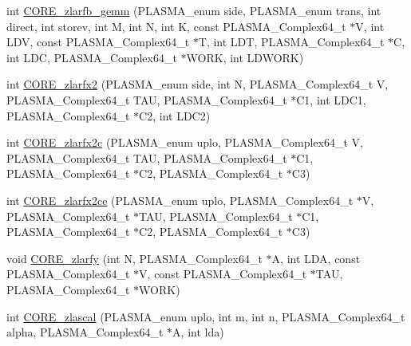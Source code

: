 \begin{DoxyCompactItemize}
\item 
int \hyperlink{group__CORE__PLASMA__Complex64__t_ga0c1fe71b571fb7ba94b9d4177a5d081f_ga0c1fe71b571fb7ba94b9d4177a5d081f}{C\+O\+R\+E\+\_\+zlarfb\+\_\+gemm} (P\+L\+A\+S\+M\+A\+\_\+enum side, P\+L\+A\+S\+M\+A\+\_\+enum trans, int direct, int storev, int M, int N, int K, const P\+L\+A\+S\+M\+A\+\_\+\+Complex64\+\_\+t $\ast$V, int L\+D\+V, const P\+L\+A\+S\+M\+A\+\_\+\+Complex64\+\_\+t $\ast$T, int L\+D\+T, P\+L\+A\+S\+M\+A\+\_\+\+Complex64\+\_\+t $\ast$C, int L\+D\+C, P\+L\+A\+S\+M\+A\+\_\+\+Complex64\+\_\+t $\ast$W\+O\+R\+K, int L\+D\+W\+O\+R\+K)
\item 
int \hyperlink{group__CORE__PLASMA__Complex64__t_ga1221507a1c507991fdb0adf89ac5872b_ga1221507a1c507991fdb0adf89ac5872b}{C\+O\+R\+E\+\_\+zlarfx2} (P\+L\+A\+S\+M\+A\+\_\+enum side, int N, P\+L\+A\+S\+M\+A\+\_\+\+Complex64\+\_\+t V, P\+L\+A\+S\+M\+A\+\_\+\+Complex64\+\_\+t T\+A\+U, P\+L\+A\+S\+M\+A\+\_\+\+Complex64\+\_\+t $\ast$C1, int L\+D\+C1, P\+L\+A\+S\+M\+A\+\_\+\+Complex64\+\_\+t $\ast$C2, int L\+D\+C2)
\item 
int \hyperlink{group__CORE__PLASMA__Complex64__t_gab76a8151ac33cab999a8e249031948f7_gab76a8151ac33cab999a8e249031948f7}{C\+O\+R\+E\+\_\+zlarfx2c} (P\+L\+A\+S\+M\+A\+\_\+enum uplo, P\+L\+A\+S\+M\+A\+\_\+\+Complex64\+\_\+t V, P\+L\+A\+S\+M\+A\+\_\+\+Complex64\+\_\+t T\+A\+U, P\+L\+A\+S\+M\+A\+\_\+\+Complex64\+\_\+t $\ast$C1, P\+L\+A\+S\+M\+A\+\_\+\+Complex64\+\_\+t $\ast$C2, P\+L\+A\+S\+M\+A\+\_\+\+Complex64\+\_\+t $\ast$C3)
\item 
int \hyperlink{group__CORE__PLASMA__Complex64__t_ga5bcceeccf232627a0c2d673f8840b428_ga5bcceeccf232627a0c2d673f8840b428}{C\+O\+R\+E\+\_\+zlarfx2ce} (P\+L\+A\+S\+M\+A\+\_\+enum uplo, P\+L\+A\+S\+M\+A\+\_\+\+Complex64\+\_\+t $\ast$V, P\+L\+A\+S\+M\+A\+\_\+\+Complex64\+\_\+t $\ast$T\+A\+U, P\+L\+A\+S\+M\+A\+\_\+\+Complex64\+\_\+t $\ast$C1, P\+L\+A\+S\+M\+A\+\_\+\+Complex64\+\_\+t $\ast$C2, P\+L\+A\+S\+M\+A\+\_\+\+Complex64\+\_\+t $\ast$C3)
\item 
void \hyperlink{group__CORE__PLASMA__Complex64__t_ga9b01972f3a8168e0a3c39adc0472d139_ga9b01972f3a8168e0a3c39adc0472d139}{C\+O\+R\+E\+\_\+zlarfy} (int N, P\+L\+A\+S\+M\+A\+\_\+\+Complex64\+\_\+t $\ast$A, int L\+D\+A, const P\+L\+A\+S\+M\+A\+\_\+\+Complex64\+\_\+t $\ast$V, const P\+L\+A\+S\+M\+A\+\_\+\+Complex64\+\_\+t $\ast$T\+A\+U, P\+L\+A\+S\+M\+A\+\_\+\+Complex64\+\_\+t $\ast$W\+O\+R\+K)
\item 
int \hyperlink{group__CORE__PLASMA__Complex64__t_ga03345e0ae169e7cd8a6f93f5bfcc5a4d_ga03345e0ae169e7cd8a6f93f5bfcc5a4d}{C\+O\+R\+E\+\_\+zlascal} (P\+L\+A\+S\+M\+A\+\_\+enum uplo, int m, int n, P\+L\+A\+S\+M\+A\+\_\+\+Complex64\+\_\+t alpha, P\+L\+A\+S\+M\+A\+\_\+\+Complex64\+\_\+t $\ast$A, int lda)

\end{DoxyCompactItemize}
